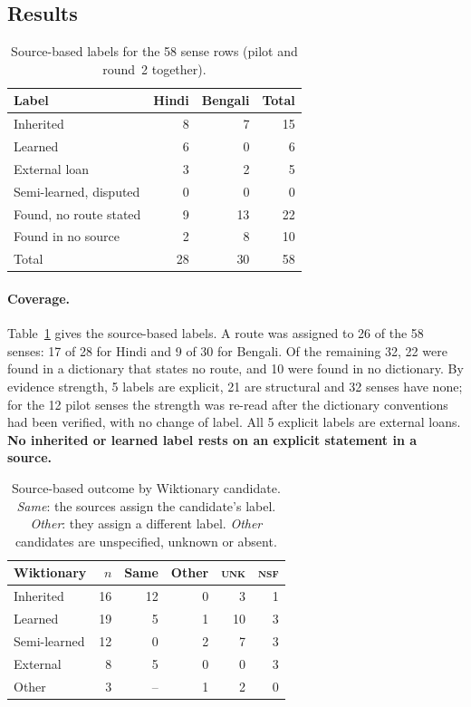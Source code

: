 \documentclass[11pt]{article}
\newcommand{\lbl}[1]{\textsc{#1}}
\begin{document}
\subsection{Results}

\begin{table}[h]
\centering\small
\begin{tabular}{lrrr}
\toprule
\textbf{Label} & \textbf{Hindi} & \textbf{Bengali} & \textbf{Total} \\
\midrule
Inherited & 8 & 7 & 15 \\
Learned & 6 & 0 & 6 \\
External loan & 3 & 2 & 5 \\
Semi-learned, disputed & 0 & 0 & 0 \\
\midrule
Found, no route stated & 9 & 13 & 22 \\
Found in no source & 2 & 8 & 10 \\
\midrule
Total & 28 & 30 & 58 \\
\bottomrule
\end{tabular}
\caption{Source-based labels for the 58 sense rows (pilot and round~2 together).}
\label{tab:labels}
\end{table}

\paragraph{Coverage.} Table~\ref{tab:labels} gives the source-based labels. A route was assigned to 26 of the 58 senses: 17 of 28 for Hindi and 9 of 30 for Bengali. Of the remaining 32, 22 were found in a dictionary that states no route, and 10 were found in no dictionary. By evidence strength, 5 labels are explicit, 21 are structural and 32 senses have none; for the 12 pilot senses the strength was re-read after the dictionary conventions had been verified, with no change of label. All 5 explicit labels are external loans. \textbf{No inherited or learned label rests on an explicit statement in a source.}

\begin{table}[h]
\centering\small
\begin{tabular}{lrrrrr}
\toprule
\textbf{Wiktionary} & \textbf{$n$} & \textbf{Same} & \textbf{Other} & \textbf{\lbl{unk}} & \textbf{\lbl{nsf}} \\
\midrule
Inherited & 16 & 12 & 0 & 3 & 1 \\
Learned & 19 & 5 & 1 & 10 & 3 \\
Semi-learned & 12 & 0 & 2 & 7 & 3 \\
External & 8 & 5 & 0 & 0 & 3 \\
Other & 3 & -- & 1 & 2 & 0 \\
\bottomrule
\end{tabular}
\caption{Source-based outcome by Wiktionary candidate. \textit{Same}: the sources assign the candidate's label. \textit{Other}: they assign a different label. \textit{Other} candidates are unspecified, unknown or absent.}
\label{tab:recover}
\end{table}
\end{document}
